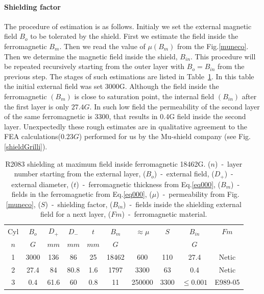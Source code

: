 \documentclass[12pt]{article}
\begin{document}
\paragraph{Shielding factor}
The procedure of estimation is as follows.
Initialy we set the  external magnetic field $B_o$ to be 
tolerated by the shield.
First we estimate the field inside the ferromagnetic $B_m$.
Then  we read the value of $\mu(B_m)$ from the Fig.\ref{muneco}.
Then  we  determine the magnetic field inside the shield, $B_{in}$.
This  procedure will be repeated recursively starting from the outer layer 
with  $B_o=B_{in}$ from the previous step.
The stages  of   such estimations are listed in Table~\ref{ca001}.
In this table  the initial external field was  set 3000G.
Although the field inside the ferromagnetic $(B_m)$ is close to saturation point,
the internal field $(B_{in})$ after the first layer  is only $27.4G$. 
In such low field the permeability of the second layer of the same ferromagnetic 
is 3300, that results in 0.4G field inside the second layer. 
Unexpectedly these rough  estimates  are in qualitative   agreement to the FEA
calculations($0.23G$) performed for us by the Mu-shield company (see Fig.\ref{shieldGrilli}).

\begin{table}[htbp]
\begin{center}
\begin{tabular}{|c|c|c|c|c|c|c|c|c|c|} \hline
Cyl&$B_{o}$ & $D_+$ & $D_-$ & $t$ & $B_m$& $\approx\mu$&$S$      &$B_{in}$     & $Fm$   \\
$n$ &  $G$  & $mm$  & $mm$  & $mm$  & $G$ &           &         &$G$         &     \\ \hline
1 &3000     &  136  &   86  & 25    & 18462&      600  & 110     & 27.4        & Netic   \\ \hline
2 &27.4     &   84  &   80.8& 1.6   & 1797 &     3300  &  63     & 0.4         & Netic   \\ \hline
3 &0.4      &  61.6 &  60   & 0.8   &  11  &    250000 &3300     &$\leq0.001$  & E989-05 \\ \hline
\end{tabular}
\end{center}
\caption{  R2083  shielding  at maximum
field inside  ferromagnetic 18462G.
($n$)~-~layer number starting from the external layer,
($B_{o}$)~-~external field,
($D_+$)~-~external diameter,
($t$)~-~ferromagnetic thickness from   Eq.\ref{eq000},
($B_m$)~-~fields in the ferromagnetic from Eq.\ref{eq000},
($\mu$)~-~permeability  from Fig.\ref{muneco},
($S$)~-~shielding factor,
($B_{in}$)~-~fields inside the shielding external field for a next layer,
($Fm$)~-~ferromagnetic material.
\label{ca001}}
\end{table}
\clearpage
\end{document}
